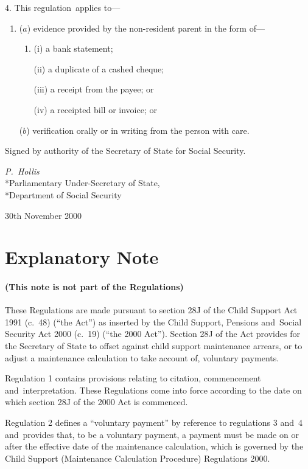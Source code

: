 \documentclass[12pt,a4paper]{article}
\begin{document}
4.  This regulation~applies to—
\begin{enumerate}\item[]
($a$) evidence provided by the non-resident parent in the form of—
\begin{enumerate}\item[]
(i) a bank statement;

(ii) a duplicate of a cashed cheque;

(iii) a receipt from the payee; or

(iv) a receipted bill or invoice; or
\end{enumerate}

($b$) verification orally or in writing from the person with care.
\end{enumerate}

\bigskip

Signed 
by authority of the Secretary of State for Social Security.

{\raggedleft
\emph{P.~Hollis}\\*Parliamentary Under-Secretary of State,\\*Department of Social Security

}

30th November 2000

\small

\part{Explanatory Note}

\renewcommand\parthead{--- Explanatory Note}

\subsection*{(This note is not part of the Regulations)}

These Regulations are made pursuant to section 28J of the Child Support Act 1991 (c.\ 48) (“the Act”) as inserted by the Child Support, Pensions and~Social Security Act 2000 (c.\ 19) (“the 2000 Act”). Section 28J of the Act provides for the Secretary of State to offset against child support maintenance arrears, or to adjust a maintenance calculation to take account of, voluntary payments.

Regulation 1 contains provisions relating to citation, commencement and~interpretation. These Regulations come into force according to the date on which section 28J of the 2000 Act is commenced.

Regulation 2 defines a “voluntary payment” by reference to regulations 3 and~4 and~provides that, to be a voluntary payment, a payment must be made on or after the effective date of the maintenance calculation, which is governed by the Child Support (Maintenance Calculation Procedure) Regulations 2000.
\end{document}
